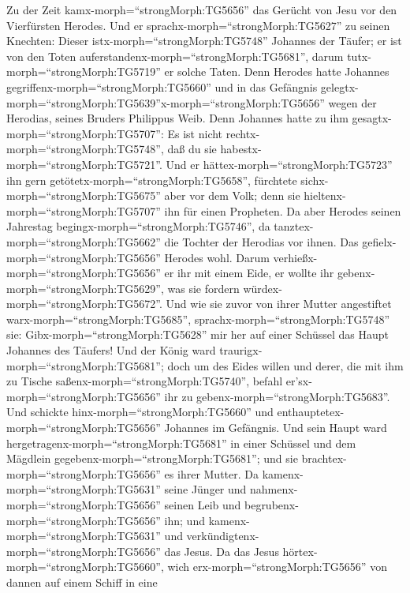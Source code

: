  Zu der Zeit kamx-morph=``strongMorph:TG5656'' das Gerücht
von Jesu vor den Vierfürsten Herodes.  Und er
sprachx-morph=``strongMorph:TG5627'' zu seinen Knechten: Dieser
istx-morph=``strongMorph:TG5748'' Johannes der Täufer; er ist von den
Toten auferstandenx-morph=``strongMorph:TG5681'', darum
tutx-morph=``strongMorph:TG5719'' er solche Taten.  Denn
Herodes hatte Johannes gegriffenx-morph=``strongMorph:TG5660'' und in
das Gefängnis
gelegtx-morph=``strongMorph:TG5639''x-morph=``strongMorph:TG5656'' wegen
der Herodias, seines Bruders Philippus Weib.  Denn Johannes
hatte zu ihm gesagtx-morph=``strongMorph:TG5707'': Es ist nicht
rechtx-morph=``strongMorph:TG5748'', daß du sie
habestx-morph=``strongMorph:TG5721''.  Und er
hättex-morph=``strongMorph:TG5723'' ihn gern
getötetx-morph=``strongMorph:TG5658'', fürchtete
sichx-morph=``strongMorph:TG5675'' aber vor dem Volk; denn sie
hieltenx-morph=``strongMorph:TG5707'' ihn für einen Propheten.
 Da aber Herodes seinen Jahrestag
begingx-morph=``strongMorph:TG5746'', da
tanztex-morph=``strongMorph:TG5662'' die Tochter der Herodias vor ihnen.
Das gefielx-morph=``strongMorph:TG5656'' Herodes wohl. 
Darum verhießx-morph=``strongMorph:TG5656'' er ihr mit einem Eide, er
wollte ihr gebenx-morph=``strongMorph:TG5629'', was sie fordern
würdex-morph=``strongMorph:TG5672''.  Und wie sie zuvor von
ihrer Mutter angestiftet warx-morph=``strongMorph:TG5685'',
sprachx-morph=``strongMorph:TG5748'' sie:
Gibx-morph=``strongMorph:TG5628'' mir her auf einer Schüssel das Haupt
Johannes des Täufers!  Und der König ward
traurigx-morph=``strongMorph:TG5681''; doch um des Eides willen und
derer, die mit ihm zu Tische saßenx-morph=``strongMorph:TG5740'', befahl
er'sx-morph=``strongMorph:TG5656'' ihr zu
gebenx-morph=``strongMorph:TG5683''.  Und schickte
hinx-morph=``strongMorph:TG5660'' und
enthauptetex-morph=``strongMorph:TG5656'' Johannes im Gefängnis.
 Und sein Haupt ward
hergetragenx-morph=``strongMorph:TG5681'' in einer Schüssel und dem
Mägdlein gegebenx-morph=``strongMorph:TG5681''; und sie
brachtex-morph=``strongMorph:TG5656'' es ihrer Mutter.  Da
kamenx-morph=``strongMorph:TG5631'' seine Jünger und
nahmenx-morph=``strongMorph:TG5656'' seinen Leib und
begrubenx-morph=``strongMorph:TG5656'' ihn; und
kamenx-morph=``strongMorph:TG5631'' und
verkündigtenx-morph=``strongMorph:TG5656'' das Jesus.  Da
das Jesus hörtex-morph=``strongMorph:TG5660'', wich
erx-morph=``strongMorph:TG5656'' von dannen auf einem Schiff in eine
